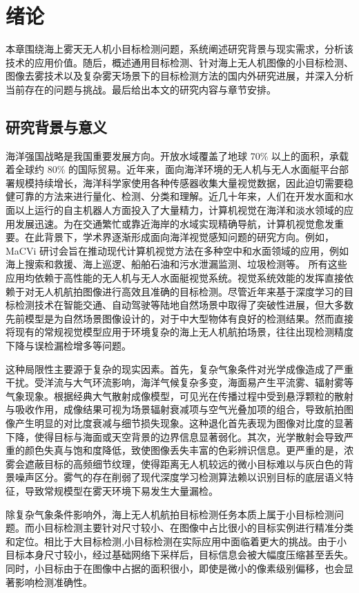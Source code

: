 \chapter{绪论}
\label{cha:intro}

本章围绕海上雾天无人机小目标检测问题，系统阐述研究背景与现实需求，分析该技术的应用价值。随后，概述通用目标检测、针对海上无人机图像的小目标检测、图像去雾技术以及复杂雾天场景下的目标检测方法的国内外研究进展，并深入分析当前存在的问题与挑战。最后给出本文的研究内容与章节安排。

\section{研究背景与意义}
海洋强国战略是我国重要发展方向。开放水域覆盖了地球 70\% 以上的面积，承载着全球约 80\% 的国际贸易\cite{ref1}。近年来，面向海洋环境的无人机与无人水面艇平台部署规模持续增长，海洋科学家使用各种传感器收集大量视觉数据，因此迫切需要稳健可靠的方法来进行量化、检测、分类和理解。近几十年来，人们在开发水面和水面以上运行的自主机器人方面投入了大量精力，计算机视觉在海洋和淡水领域的应用发展迅速。为在交通繁忙或靠近海岸的水域实现精确导航，计算机视觉愈发重要。在此背景下，学术界逐渐形成面向海洋视觉感知问题的研究方向。例如，MaCVi\cite{ref2} 研讨会旨在推动现代计算机视觉方法在多种空中和水面领域的应用，例如海上搜索和救援、海上巡逻、船舶石油和污水泄漏监测、垃圾检测等。
所有这些应用均依赖于高性能的无人机与无人水面艇视觉系统。视觉系统效能的发挥直接依赖于对无人机航拍图像进行高效且准确的目标检测。尽管近年来基于深度学习的目标检测技术在智能交通、自动驾驶等陆地自然场景中取得了突破性进展，但大多数先前模型是为自然场景图像设计的，对于中大型物体有良好的检测结果。然而直接将现有的常规视觉模型应用于环境复杂的海上无人机航拍场景，往往出现检测精度下降与误检漏检增多等问题。

这种局限性主要源于复杂的现实因素。首先，复杂气象条件对光学成像造成了严重干扰。受洋流与大气环流影响，海洋气候复杂多变，海面易产生平流雾、辐射雾等气象现象。根据经典大气散射成像模型，可见光在传播过程中受到悬浮颗粒的散射与吸收作用，成像结果可视为场景辐射衰减项与空气光叠加项的组合，导致航拍图像产生明显的对比度衰减与细节损失现象。这种退化首先表现为图像对比度的显著下降，使得目标与海面或天空背景的边界信息显著弱化。其次，光学散射会导致严重的颜色失真与饱和度降低，致使图像丢失丰富的色彩辨识信息。更严重的是，浓雾会遮蔽目标的高频细节纹理，使得距离无人机较远的微小目标难以与灰白色的背景噪声区分。雾气的存在削弱了现代深度学习检测算法赖以识别目标的底层语义特征，导致常规模型在雾天环境下易发生大量漏检。

除复杂气象条件影响外，海上无人机航拍目标检测任务本质上属于小目标检测问题。而小目标检测主要针对尺寸较小、在图像中占比很小的目标实例进行精准分类和定位。相比于大目标检测,小目标检测在实际应用中面临着更大的挑战。由于小目标本身尺寸较小，经过基础网络下采样后，目标信息会被大幅度压缩甚至丢失。同时，小目标由于在图像中占据的面积很小，即使是微小的像素级别偏移，也会显著影响检测准确性。

